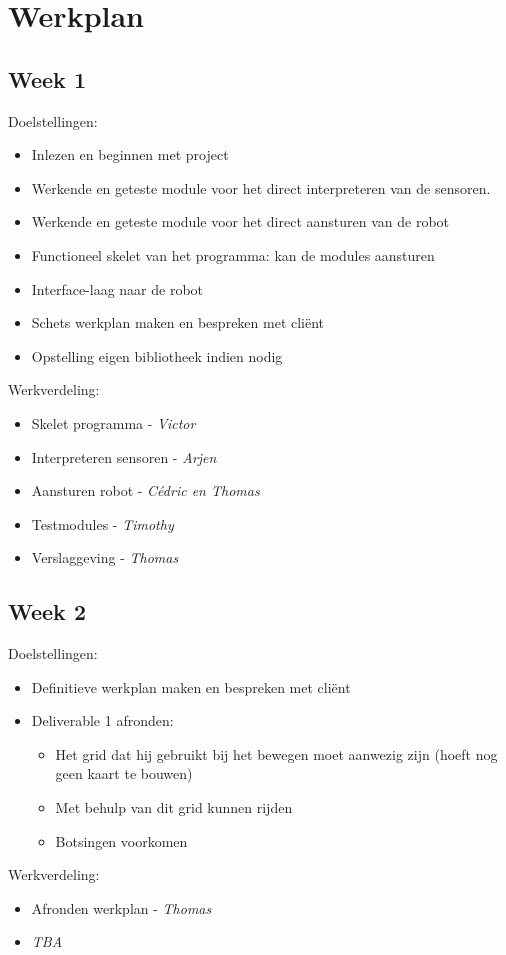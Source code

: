 \documentclass[a4paper, 11pt]{article}
\begin{document}
\section*{Werkplan}
  \subsection*{Week 1}
    Doelstellingen:
    \begin{itemize}
        \item Inlezen en beginnen met project
	\item Werkende en geteste module voor het direct interpreteren van de sensoren.
	\item Werkende en geteste module voor het direct aansturen van de robot
	\item Functioneel skelet van het programma: kan de modules aansturen
	\item Interface-laag naar de robot
	\item Schets werkplan maken en bespreken met cli\"ent
	\item Opstelling eigen bibliotheek indien nodig
    \end{itemize}
    Werkverdeling:
    \begin{itemize}
        \item Skelet programma - \emph{Victor}
        \item Interpreteren sensoren - \emph{Arjen}
        \item Aansturen robot - \emph{C\'edric en Thomas}
        \item Testmodules - \emph{Timothy}
        \item Verslaggeving - \emph{Thomas}
    \end{itemize}
    
  \subsection*{Week 2}
    Doelstellingen:
    \begin{itemize}
	\item Definitieve werkplan maken en bespreken met cli\"ent
        \item Deliverable 1 afronden:
          \begin{itemize}
           \item Het grid dat hij gebruikt bij het bewegen moet aanwezig zijn (hoeft nog geen kaart te bouwen)
           \item Met behulp van dit grid kunnen rijden
           \item Botsingen voorkomen
          \end{itemize}
    \end{itemize}
    Werkverdeling:
    \begin{itemize}
        \item Afronden werkplan - \emph{Thomas}
        \item  \emph{TBA}
    \end{itemize}
    
\end{document}
